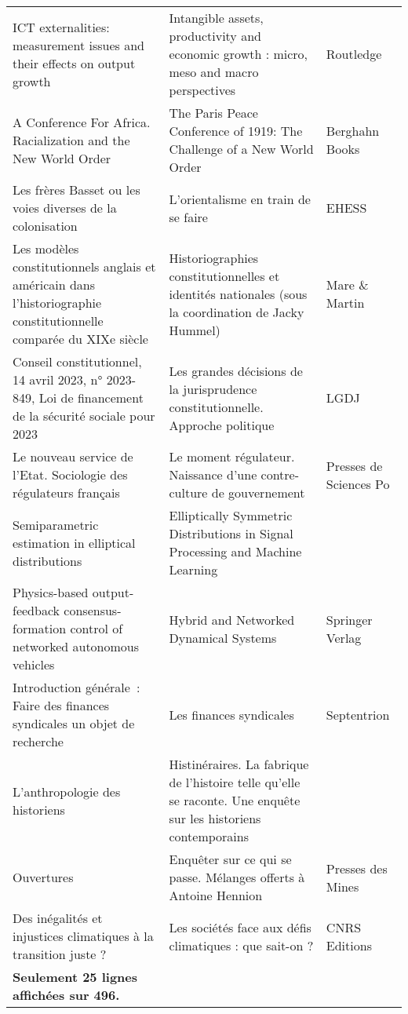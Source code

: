 \begin{longtable}{p{.4\linewidth}p{.35\linewidth}p{.15\linewidth}}
ICT externalities: measurement issues and their effects on output growth & Intangible assets, productivity and economic growth : micro, meso and macro perspectives & Routledge \\
A Conference For Africa. Racialization and the New World Order & The Paris Peace Conference of 1919: The Challenge of a New World Order & Berghahn Books \\
Les frères Basset ou les voies diverses de la colonisation & L’orientalisme en train de se faire & EHESS \\
Les modèles constitutionnels anglais et américain dans l’historiographie constitutionnelle comparée du XIXe siècle & Historiographies constitutionnelles et identités nationales (sous la coordination de Jacky Hummel) & Mare \& Martin \\
Conseil constitutionnel, 14 avril 2023, n° 2023-849, Loi de financement de la sécurité sociale pour 2023 & Les grandes décisions de la jurisprudence constitutionnelle. Approche politique & LGDJ \\
Le nouveau service de l'Etat. Sociologie des régulateurs français & Le moment régulateur. Naissance d'une contre-culture de gouvernement & Presses de Sciences Po \\
Semiparametric estimation in elliptical distributions & Elliptically Symmetric Distributions in Signal Processing and Machine Learning &  \\
Physics-based output-feedback consensus-formation control of networked autonomous vehicles & Hybrid and Networked Dynamical Systems & Springer Verlag \\
Introduction générale : Faire des finances syndicales un objet de recherche & Les finances syndicales & Septentrion \\
L'anthropologie des historiens & Histinéraires. La fabrique de l’histoire telle qu’elle se raconte. Une enquête sur les historiens contemporains &  \\
Ouvertures & Enquêter sur ce qui se passe. Mélanges offerts à Antoine Hennion & Presses des Mines \\
Des inégalités et injustices climatiques à la transition juste ? & Les sociétés face aux défis climatiques : que sait-on ? & CNRS Editions \\
\textbf{Seulement 25 lignes affichées sur 496.} \\
\bottomrule
\end{longtable}
